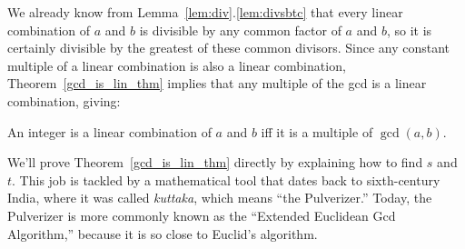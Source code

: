 We already know from Lemma~\ref{lem:div}.\ref{lem:divsbtc} that every
linear combination of $a$ and $b$ is divisible by any common factor of
$a$ and $b$, so it is certainly divisible by the greatest of these
common divisors.  Since any constant multiple of a linear combination
is also a linear combination, Theorem~\ref{gcd_is_lin_thm} implies
that any multiple of the gcd is a linear combination, giving:
\begin{corollary}\label{cor:lin-comb}
An integer is a linear combination of $a$ and $b$ iff it is a multiple
of $\gcd(a, b)$.
\end{corollary}

We'll prove Theorem~\ref{gcd_is_lin_thm} directly by explaining how to
find $s$ and $t$.  This job is tackled by a mathematical tool that
dates back to sixth-century India, where it was called \emph{kuttaka},
which means ``the Pulverizer.''  Today, the Pulverizer%
is more commonly known as the ``Extended Euclidean Gcd Algorithm,'' because it
is so close to Euclid's algorithm.

